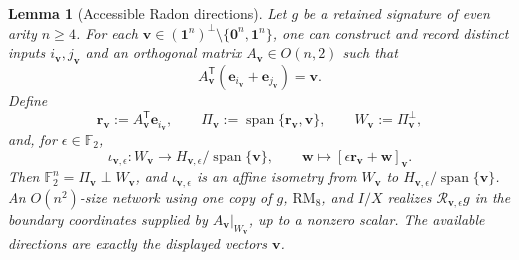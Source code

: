 \documentclass[11pt,letterpaper,onecolumn]{article}
\theoremstyle{plain}
\newtheorem{lemma}[lemma]{Lemma}
\theoremstyle{definition}
\theoremstyle{remark}
\newcommand{\Ftwo}{\mathbb F_2}
\newcommand{\Span}{\operatorname{span}}
\newcommand{\one}{\mathbf 1}
\newcommand{\zero}{\mathbf 0}
\newcommand{\RMcore}{\mathrm{RM}_8}
\begin{document}
\begin{lemma}[Accessible Radon directions]
\label{lem:rm-radon-accessible}
Let \(g\) be a retained signature of even arity \(n\ge4\).  For each
\({\mathbf{v}}\in(\one^n)^\perp\setminus\{\zero^n,\one^n\}\), one can construct and
record distinct inputs \(i_{\mathbf{v}},j_{\mathbf{v}}\) and an orthogonal matrix
\(A_{\mathbf{v}}\in O(n,2)\) such that
\[
 A_{\mathbf{v}}^{\mathsf T}({\mathbf{e}}_{i_{\mathbf{v}}}+{\mathbf{e}}_{j_{\mathbf{v}}})={\mathbf{v}}.
\]
Define
\[
 {\mathbf{r}}_{\mathbf{v}}:=A_{\mathbf{v}}^{\mathsf T}{\mathbf{e}}_{i_{\mathbf{v}}},\qquad
 \Pi_{\mathbf{v}}:=\Span\{{\mathbf{r}}_{\mathbf{v}},{\mathbf{v}}\},\qquad W_{\mathbf{v}}:=\Pi_{\mathbf{v}}^\perp,
\]
and, for \(\epsilon\in\Ftwo\),
\[
 \iota_{{\mathbf{v}},\epsilon}:W_{\mathbf{v}}\longrightarrow
 H_{{\mathbf{v}},\epsilon}/\Span\{{\mathbf{v}}\},\qquad
 {\mathbf{w}}\longmapsto[\epsilon {\mathbf{r}}_{\mathbf{v}}+{\mathbf{w}}]_{\mathbf{v}}.
\]
Then \(\Ftwo^n=\Pi_{\mathbf{v}}\perp W_{\mathbf{v}}\), and \(\iota_{{\mathbf{v}},\epsilon}\) is
an affine isometry from \(W_{\mathbf{v}}\) to
\(H_{{\mathbf{v}},\epsilon}/\Span\{{\mathbf{v}}\}\).  An \(O(n^2)\)-size network using
one copy of \(g\), \(\RMcore\), and \(I/X\) realizes
\(\mathcal R_{{\mathbf{v}},\epsilon}g\) in the boundary coordinates supplied by
\(A_{\mathbf{v}}|_{W_{\mathbf{v}}}\), up to a nonzero scalar.  The available
directions are exactly the displayed vectors \({\mathbf{v}}\).
\end{lemma}
\end{document}

